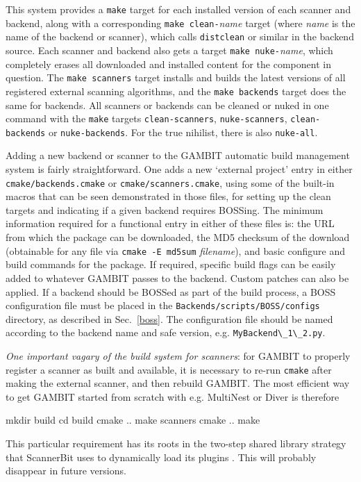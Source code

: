 \documentclass[pdftex,twocolumn,epjc3_preprint,runningheads]{svjour3}
\renewcommand{\_}{\discretionary{\underscore}{}{\underscore}}
\newcommand\term[1]{{\lstset{style=terminal}\lstinline!#1!\lstset{style=cpp}}}
\newcommand{\metavarf}[1]{\textit{\color{darkgreen}\footnotesize\textrm{#1}}}
\newcommand{\metavar}{\metavarf}
\newcommand{\gambit}{\textsf{GAMBIT}\xspace}
\newcommand{\scannerbit}{\textsf{ScannerBit}\xspace}
\newcommand{\BOSS}{\textsf{BOSS}\xspace}
\newcommand{\GB}{\gambit}
\begin{document}
This system provides a \term{make} target for each installed version of each scanner and backend, along with a corresponding \term{make clean-}\metavar{name} target (where \metavar{name} is the name of the backend or scanner), which calls \term{distclean} or similar in the backend source. Each scanner and backend also gets a target \term{make nuke-}\metavar{name}, which completely erases all downloaded and installed content for the component in question.  The \term{make scanners} target installs and builds the latest versions of all registered external scanning algorithms, and the \term{make backends} target does the same for backends.  All scanners or backends can be cleaned or nuked in one command with the \term{make} targets \term{clean-scanners}, \term{nuke-scanners}, \term{clean-backends} or \term{nuke-backends}.  For the true nihilist, there is also \term{nuke-all}.

Adding a new backend or scanner to the \GB automatic build management system is fairly straightforward.  One adds a new `external project' entry in either \term{cmake/backends.cmake} or \term{cmake/scanners.cmake}, using some of the built-in macros that can be seen demonstrated in those files, for setting up the clean targets and indicating if a given backend requires BOSSing. The minimum information required for a functional entry in either of these files is: the URL from which the package can be downloaded, the MD5 checksum of the download (obtainable for any file via \term{cmake -E md5sum} \metavar{filename}), and basic configure and build commands for the package.  If required, specific build flags can be easily added to whatever \GB passes to the backend.  Custom patches can also be applied.  If a backend should be BOSSed as part of the build process, a \BOSS configuration file must be placed in the \term{Backends/scripts/BOSS/configs} directory, as described in Sec.\ \ref{boss}. The configuration file should be named according to the backend name and safe version, e.g. \term{MyBackend\_1\_2.py}.

\textit{One important vagary of the build system for scanners}: for \GB to properly register a scanner as built and available, it is necessary to re-run \term{cmake} after making the external scanner, and then rebuild \GB.  The most efficient way to get \GB started from scratch with e.g. \textsf{MultiNest} \cite{MultiNest} or \textsf{Diver} \cite{ScannerBit} is therefore
\lstset{style=terminal}
\begin{lstterm}
mkdir build
cd build
cmake ..
make scanners
cmake ..
make
\end{lstterm}
This particular requirement has its roots in the two-step shared library strategy that \scannerbit uses to dynamically load its plugins \cite{ScannerBit}.  This will probably disappear in future versions.
\end{document}
